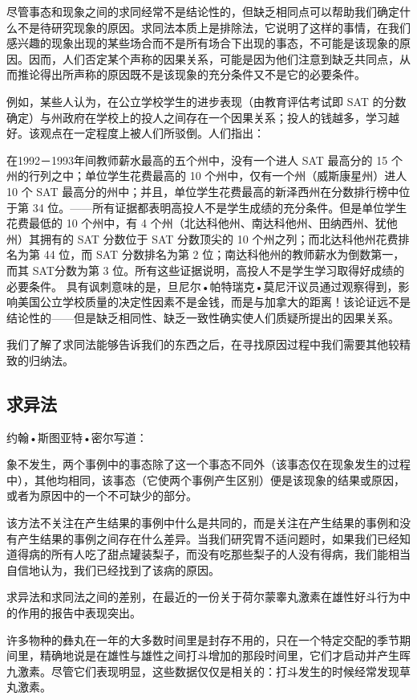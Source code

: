 尽管事态和现象之间的求同经常不是结论性的，但缺乏相同点可以帮助我们确定什么不是待研究现象的原因。求同法本质上是排除法，它说明了这样的事情，在我们感兴趣的现象出现的某些场合而不是所有场合下出现的事态，不可能是该现象的原因。因而，人们否定某个声称的因果关系，可能是因为他们注意到缺乏共同点，从而推论得出所声称的原因既不是该现象的充分条件又不是它的必要条件。

例如，某些人认为，在公立学校学生的进步表现（由教育评估考试即 SAT 的分数确定）与州政府在学校上的投人之间存在一个因果关系；投人的钱越多，学习越好。该观点在一定程度上被人们所驳倒。人们指出：

在1992－1993年间教师薪水最高的五个州中，没有一个进人 SAT 最高分的 15 个州的行列之中；单位学生花费最高的 10 个州中，仅有一个州（威斯康星州）进人 10 个 SAT 最高分的州中；并且，单位学生花费最高的新泽西州在分数排行榜中位于第 34 位。——所有证据都表明高投人不是学生成绩的充分条件。但是单位学生花费最低的 10 个州中，有 4 个州（北达科他州、南达科他州、田纳西州、犹他州）其拥有的 SAT 分数位于 SAT 分数顶尖的 10 个州之列；而北达科他州花费排名为第 44 位，而 SAT 分数排名为第 2 位；南达科他州的教师薪水为倒数第一，而其 SAT分数为第 3 位。所有这些证据说明，高投人不是学生学习取得好成绩的必要条件。\cite{forbes1996} 具有讽刺意味的是，旦尼尔•帕特瑞克•莫尼汗议员通过观察得到，影响美国公立学校质量的决定性因素不是金钱，而是与加拿大的距离！该论证远不是结论性的——但是缺乏相同性、缺乏一致性确实使人们质疑所提出的因果关系。

我们了解了求同法能够告诉我们的东西之后，在寻找原因过程中我们需要其他较精致的归纳法。

\subsection{求异法}
约翰•斯图亚特•密尔写道：

象不发生，两个事例中的事态除了这一个事态不同外（该事态仅在现象发生的过程中），其他均相同，该事态（它使两个事例产生区别）便是该现象的结果或原因，或者为原因中的一个不可缺少的部分。

该方法不关注在产生结果的事例中什么是共同的，而是关注在产生结果的事例和没有产生结果的事例之间存在什么差异。当我们研究胃不适问题时，如果我们已经知道得病的所有人吃了甜点罐装梨子，而没有吃那些梨子的人没有得病，我们能相当自信地认为，我们已经找到了该病的原因。

求异法和求同法之间的差别，在最近的一份关于荷尔蒙睾丸激素在雄性好斗行为中的作用的报告中表现突出。

许多物种的彝丸在一年的大多数时间里是封存不用的，只在一个特定交配的季节期间里，精确地说是在雄性与雄性之间打斗增加的那段时间里，它们才启动并产生晖九激素。尽管它们表现明显，这些数据仅仅是相关的：打斗发生的时候经常发现草丸激素。

